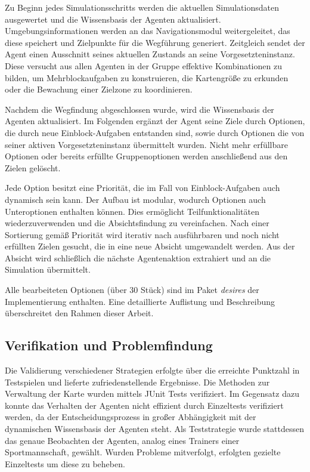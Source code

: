 \documentclass[runningheads]{llncs}
\begin{document}
Zu Beginn jedes Simulationsschritts werden die aktuellen Simulationsdaten ausgewertet und die Wissensbasis der Agenten aktualisiert. Umgebungsinformationen werden an das Navigationsmodul weitergeleitet, das diese speichert und Zielpunkte für die Wegführung generiert. Zeitgleich sendet der Agent einen Ausschnitt seines aktuellen Zustands an seine Vorgesetzteninstanz. Diese versucht aus allen Agenten in der Gruppe effektive Kombinationen zu bilden, um Mehrblockaufgaben zu konstruieren, die Kartengröße zu erkunden oder die Bewachung einer Zielzone zu koordinieren.

Nachdem die Wegfindung abgeschlossen wurde, wird die Wissensbasis der Agenten aktualisiert. Im Folgenden ergänzt der Agent seine Ziele durch Optionen, die durch neue Einblock-Aufgaben entstanden sind, sowie durch Optionen die von seiner aktiven Vorgesetzteninstanz übermittelt wurden. Nicht mehr erfüllbare Optionen oder bereits erfüllte Gruppenoptionen werden anschließend aus den Zielen gelöscht.

Jede Option besitzt eine Priorität, die im Fall von Einblock-Aufgaben auch dynamisch sein kann. Der Aufbau ist modular, wodurch Optionen auch Unteroptionen enthalten können. Dies ermöglicht Teilfunktionalitäten wiederzuverwenden und die Absichtsfindung zu vereinfachen. Nach einer Sortierung gemäß Priorität wird iterativ nach ausführbaren und noch nicht erfüllten Zielen gesucht, die in eine neue Absicht umgewandelt werden. Aus der Absicht wird schließlich die nächste Agentenaktion extrahiert und an die Simulation übermittelt.

Alle bearbeiteten Optionen (über 30 Stück) sind im Paket \textit{desires} der Implementierung enthalten. Eine detaillierte Auflistung und Beschreibung überschreitet den Rahmen dieser Arbeit.


\subsection{Verifikation und Problemfindung}\label{verifikation}
Die Validierung verschiedener Strategien erfolgte über die erreichte Punktzahl in Testspielen und lieferte zufriedenstellende Ergebnisse. Die Methoden zur Verwaltung der Karte wurden mittels JUnit Tests \cite{JUnit} verifiziert. Im Gegensatz dazu konnte das Verhalten der Agenten nicht effizient durch Einzeltests verifiziert werden, da der Entscheidungsprozess in großer Abhängigkeit mit der dynamischen Wissensbasis der Agenten steht.
Als Teststrategie wurde stattdessen das genaue Beobachten der Agenten, analog eines Trainers einer Sportmannschaft, gewählt. Wurden Probleme mitverfolgt, erfolgten gezielte Einzeltests um diese zu beheben.
\end{document}
